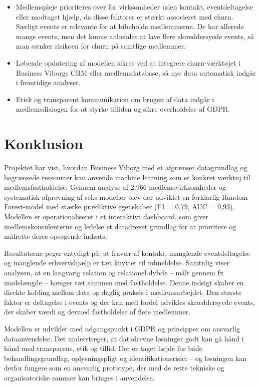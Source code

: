 \documentclass[
  11pt,
  letterpaper,
  DIV=11,
  numbers=noendperiod]{scrartcl}
\begin{document}
\begin{itemize}
\item
  Medlemspleje prioriteres over for virksomheder uden kontakt,
  eventdeltagelse eller modtaget hjælp, da disse faktorer er stærkt
  associeret med churn. Særligt events er relevante for at bibeholde
  medlemmerne. De har allerede mange events, men det kunne anbefales at
  lave flere skræddersyede events, så man sænker risikoen for churn på
  samtlige medlemmer.
\item
  Løbende opdatering af modellen sikres ved at integrere churn-værktøjet
  i Business Viborgs CRM eller medlemsdatabase, så nye data automatisk
  indgår i fremtidige analyser.
\item
  Etisk og transparent kommunikation om brugen af data indgår i
  medlemsdialogen for at styrke tilliden og sikre overholdelse af GDPR.
\end{itemize}

\section{Konklusion}\label{konklusion}

Projektet har vist, hvordan Business Viborg med et afgrænset
datagrundlag og begrænsede ressourcer kan anvende machine learning som
et konkret værktøj til medlemsfastholdelse. Gennem analyse af 2.966
medlemsvirksomheder og systematisk afprøvning af seks modeller blev der
udviklet en forklarlig Random Forest-model med stærke prædiktive
egenskaber (F1 = 0,79, AUC = 0,93). Modellen er operationaliseret i et
interaktivt dashboard, som giver medlemskonsulenterne og ledelse et
datadrevet grundlag for at prioritere og målrette deres opsøgende
indsats.

Resultaterne peger entydigt på, at fravær af kontakt, manglende
eventdeltagelse og manglende erhvervshjælp er tæt knyttet til
udmeldelse. Samtidig viser analysen, at en langvarig relation og
relationel dybde -- målt gennem fx mødelængde -- hænger tæt sammen med
fastholdelse. Denne indsigt skaber en direkte kobling mellem data og
daglig praksis i medlemsarbejdet. Den største faktor er deltagelse i
events og der kan med fordel udvikles skræddersyede events, der skaber
værdi og dermed fastholdelse af flere medlemmer.

Modellen er udviklet med udgangspunkt i GDPR og principper om ansvarlig
dataanvendelse. Det understreger, at datadrevne løsninger godt kan gå
hånd i hånd med transparens, etik og tillid. Der er taget højde for både
behandlingsgrundlag, oplysningspligt og identifikationsrisici -- og
løsningen kan derfor fungere som en ansvarlig prototype, der med de
rette tekniske og organisatoriske rammer kan bringes i anvendelse.
\end{document}
